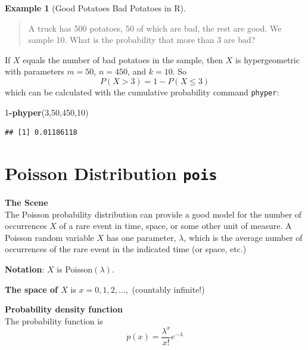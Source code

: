 \documentclass[
]{book}
\newenvironment{Shaded}{\begin{snugshade}}{\end{snugshade}}
\newcommand{\DecValTok}[1]{\textcolor[rgb]{0.00,0.00,0.81}{#1}}
\newcommand{\FunctionTok}[1]{\textcolor[rgb]{0.13,0.29,0.53}{\textbf{#1}}}
\newcommand{\NormalTok}[1]{#1}
\newcommand{\SpecialCharTok}[1]{\textcolor[rgb]{0.81,0.36,0.00}{\textbf{#1}}}
\theoremstyle{definition}
\theoremstyle{definition}
\newtheorem{example}{Example}[chapter]
\theoremstyle{definition}
\theoremstyle{definition}
\theoremstyle{remark}
\begin{document}
\begin{example}[Good Potatoes Bad Potatoes in R]
\protect\hypertarget{exm:potatoes-R}{}\label{exm:potatoes-R}\leavevmode

\begin{quote}
A truck has 500 potatoes, 50 of which are bad, the rest are good. We sample 10. What is the probability that more than 3 are bad?
\end{quote}

If \(X\) equals the number of bad potatoes in the sample, then \(X\) is hypergeometric with parameters \(m = 50\), \(n=450\), and \(k = 10\).
So \[P(X > 3) = 1 - P(X \leq 3)\]
which can be calculated with the cumulative probability command \texttt{phyper}:

\begin{Shaded}
\begin{Highlighting}[]
\DecValTok{1}\SpecialCharTok{{-}}\FunctionTok{phyper}\NormalTok{(}\DecValTok{3}\NormalTok{,}\DecValTok{50}\NormalTok{,}\DecValTok{450}\NormalTok{,}\DecValTok{10}\NormalTok{)}
\end{Highlighting}
\end{Shaded}

\begin{verbatim}
## [1] 0.01186118
\end{verbatim}

\end{example}

\section{\texorpdfstring{Poisson Distribution \texttt{pois}}{Poisson Distribution pois}}\label{poisson-distribution-pois}

\textbf{The Scene}\\
The Poisson probability distribution can provide a good model for the number of occurrences \(X\) of a rare event in time, space, or some other unit of measure. A Poisson random variable \(X\) has one parameter, \(\lambda\), which is the average number of occurrences of the rare event in the indicated time (or space, etc.)

\textbf{Notation}: \(X\) is Poisson\((\lambda)\).

\textbf{The space of \(X\)} is \(x = 0,1,2,\ldots,\) (countably infinite!)

\textbf{Probability density function}\\
The probability function is \[p(x)=\frac{\lambda^x}{x!}e^{-\lambda}\]
\end{document}
